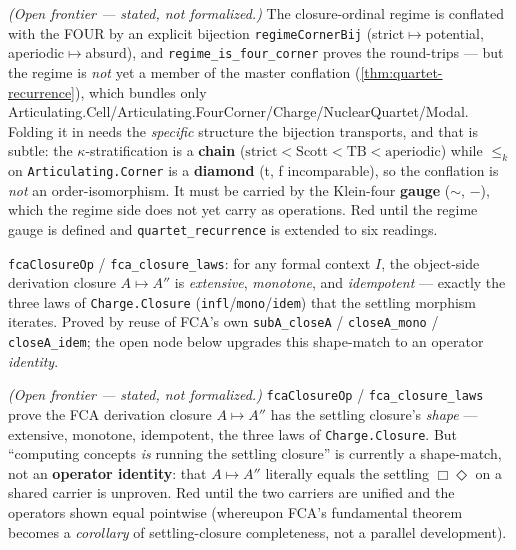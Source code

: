 \begin{theorem}\label{thm:regime-quartet-member}\notready{}
\emph{(Open frontier --- stated, not formalized.)} The closure-ordinal regime is conflated with the FOUR by an explicit bijection \texttt{regimeCornerBij} (strict$\mapsto$potential, aperiodic$\mapsto$absurd), and \texttt{regime\_is\_four\_corner} proves the round-trips --- but the regime is \emph{not} yet a member of the master conflation (\cref{thm:quartet-recurrence}), which bundles only Articulating.Cell/Articulating.FourCorner/Charge/NuclearQuartet/Modal. Folding it in needs the \emph{specific} structure the bijection transports, and that is subtle: the $\kappa$-stratification is a \textbf{chain} ($\mathrm{strict}<\mathrm{Scott}<\mathrm{TB}<\mathrm{aperiodic}$) while $\leq_k$ on \texttt{Articulating.Corner} is a \textbf{diamond} (t, f incomparable), so the conflation is \emph{not} an order-isomorphism. It must be carried by the Klein-four \textbf{gauge} ($\sim$, $-$), which the regime side does not yet carry as operations. Red until the regime gauge is defined and \texttt{quartet\_recurrence} is extended to six readings.
\end{theorem}
\begin{theorem}\label{thm:fca-closure-laws}\leanok{}
\texttt{fcaClosureOp} / \texttt{fca\_closure\_laws}: for any formal context $I$, the object-side derivation closure $A\mapsto A''$ is \emph{extensive}, \emph{monotone}, and \emph{idempotent} --- exactly the three laws of \texttt{Charge.Closure} (\texttt{infl}/\texttt{mono}/\texttt{idem}) that the settling morphism iterates. Proved by reuse of FCA's own \texttt{subA\_closeA} / \texttt{closeA\_mono} / \texttt{closeA\_idem}; the open node below upgrades this shape-match to an operator \emph{identity}.
\end{theorem}
\begin{theorem}\label{thm:fca-closure-eq-settling}\notready{}
\emph{(Open frontier --- stated, not formalized.)} \texttt{fcaClosureOp} / \texttt{fca\_closure\_laws} prove the FCA derivation closure $A \mapsto A''$ has the settling closure's \emph{shape} --- extensive, monotone, idempotent, the three laws of \texttt{Charge.Closure}. But ``computing concepts \emph{is} running the settling closure'' is currently a shape-match, not an \textbf{operator identity}: that $A \mapsto A''$ literally equals the settling $\Box\Diamond$ on a shared carrier is unproven. Red until the two carriers are unified and the operators shown equal pointwise (whereupon FCA's fundamental theorem becomes a \emph{corollary} of settling-closure completeness, not a parallel development).
\end{theorem}
